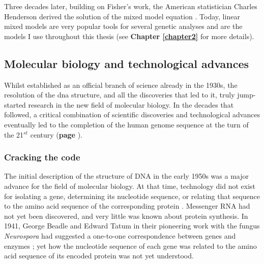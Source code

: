 Three decades later, building on Fisher’s work, the American statistician Charles Henderson derived the solution of the mixed model equation \cite{henderson1950estimation}. 
Today, linear mixed models are very popular tools for several genetic analyses and are the models I use throughout this thesis (see \textbf{Chapter
\ref{chapter2}} for more details).

\newpage

\subsection{Molecular biology and technological advances}
\label{sec:genetic_timeline}

Whilst established as an official branch of science already in the 1930s, the resolution of the \gls{dna} structure, and all the discoveries that led to it, truly jump-started research in the new field of molecular biology.
In the decades that followed, a critical combination of scientific discoveries and technological advances eventually led to the completion of the human genome sequence at the turn of the 21$^{st}$ century \cite{nhgri2003genetic} (\textbf{page \pageref{sec:hgp}}).

\subsubsection{Cracking the code}
\label{sec:genetic_code}

The initial description of the structure of DNA in the early 1950s was a major advance for the field of molecular biology. 
At that time, technology did not exist for isolating a gene, determining its nucleotide sequence, or relating that sequence to the amino acid sequence of the corresponding protein \cite{yanofsky2007establishing}. 
Messenger RNA had not yet been discovered, and very little was known about protein synthesis. 
In 1941, George Beadle and Edward Tatum in their pioneering work with the fungus \textit{Neurospora} had suggested a one-to-one correspondence between genes and enzymes \cite{beadle1941genetic}; 
yet how the nucleotide sequence of each gene was related to the amino acid sequence of its encoded protein was not yet understood.\\

